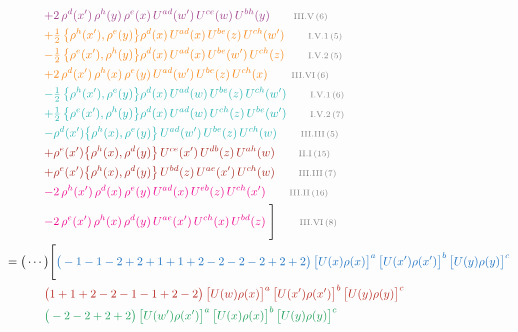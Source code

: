 \documentclass[10pt]{article}
\begin{document}
\begin{align}
&\qquad{\color{DarkOrchid}+2\,\rho^{d}(x')\,\rho^{h}(y)\, \rho^{e}(x)\,U^{ad}(w')\,U^{ce}(w)\,U^{bh}(y)}\tag*{\color{gray}\scriptsize III.V\,(6)}\\
&\qquad{\color{BurntOrange}+\tfrac{1}{2}\,\big\{\rho^{h}(x'),\rho^{e}(y)\big\}\rho^{d}(x)\,U^{ad}(x)\,U^{be}(z)\,U^{ch}(w')}\tag*{\color{gray}\scriptsize I.V.1\,(5)}\\
&\qquad{\color{BurntOrange}-\tfrac{1}{2}\,\big\{\rho^{e}(x'),\rho^{h}(y)\big\}\rho^{d}(x)\,U^{ad}(x)\,U^{be}(w')\,U^{ch}(z)}\tag*{\color{gray}\scriptsize I.V.2\,(5)}\\
&\qquad{\color{BurntOrange}+2\,\rho^{d}(x')\,\rho^{h}(x)\, \rho^{e}(y)\,U^{ad}(w')\,U^{be}(z)\,U^{ch}(x)}\tag*{\color{gray}\scriptsize III.VI\,(6)}\\
&\qquad{\color{TealBlue}-\tfrac{1}{2}\,\big\{\rho^{h}(x'),\rho^{e}(y)\big\}\rho^{d}(x)\,U^{ad}(w)\,U^{be}(z)\,U^{ch}(w')}\tag*{\color{gray}\scriptsize I.V.1\,(6)}\\
&\qquad{\color{TealBlue}+\tfrac{1}{2}\,\big\{\rho^{e}(x'),\rho^{h}(y)\big\}\rho^{d}(x)\,U^{ad}(w)\,U^{ch}(z)\,U^{be}(w')}\tag*{\color{gray}\scriptsize I.V.2\,(7)}\\
&\qquad{\color{TealBlue}-\rho^{d}(x')\big\{\rho^{h}(x),\rho^{e}(y)\big\}\,U^{ad}(w')\,U^{be}(z)\,U^{ch}(w)}\tag*{\color{gray}\scriptsize III.III\,(5)}\\
&\qquad{\color{Mahogany}+\rho^{e}(x')\big\{\rho^{h}(x),\rho^{d}(y)\big\}\,U^{ce}(x')\,U^{db}(z)\,U^{ah}(w)}\tag*{\color{gray}\scriptsize II.I\,(15)}\\
&\qquad{\color{Mahogany}+\rho^{e}(x')\big\{\rho^{h}(x),\rho^{d}(y)\big\}\,U^{bd}(z)\,U^{ae}(x')\,U^{ch}(w)}\tag*{\color{gray}\scriptsize III.III\,(7)}\\
&\qquad{\color{Magenta}-2\,\rho^{h}(x')\,\rho^{d}(x)\,\rho^{e}(y)\,U^{ad}(x)\,U^{eb}(z)\,U^{ch}(x')}\tag*{\color{gray}\scriptsize III.II\,(16)}\\
&\qquad{\color{Magenta}-2\,\rho^{e}(x')\,\rho^{h}(x)\, \rho^{d}(y)\,U^{ae}(x')\,U^{ch}(x)\,U^{bd}(z)}\;\Bigg]\tag*{\color{gray}\scriptsize III.VI\,(8)}\\
={}&\big(\cdots\big)\Bigg[{\color{RoyalBlue}\big(-1-1-2+2+1+1+2-2-2-2+2+2\big)\,\big[U(x)\rho(x)\big]^{a}\,\big[U(x')\rho(x')\big]^{b}\,\big[U(y)\rho(y)\big]^{c}}\notag\\
&\qquad{\color{BrickRed}\big(1+1+2-2-1-1+2-2\big)\,\big[U(w)\rho(x)\big]^{a}\,\big[U(x')\rho(x')\big]^{b}\,\big[U(y)\rho(y)\big]^{c}}\notag\\
&\qquad{\color{ForestGreen}\big(-2-2+2+2\big)\,\big[U(w')\rho(x')\big]^{a}\,\big[U(x)\rho(x)\big]^{b}\,\big[U(y)\rho(y)\big]^{c}}\notag\\

\end{align}
\end{document}
